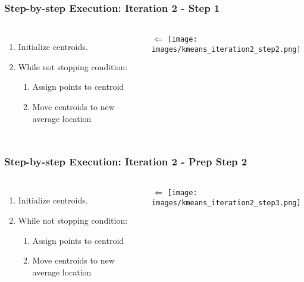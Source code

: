 \documentclass{beamer}
\begin{document}
\begin{frame}
  \frametitle{Step-by-step Execution: Iteration 2 - Step 1}
  \begin{columns}
      \begin{enumerate}
        \item Initialize centroids. \vspace{2mm}
        \item While not stopping condition: \vspace{2mm}
        \begin{enumerate}
          \item Assign points to centroid \vspace{2mm}
          \item Move centroids to new average location
        \end{enumerate}
      \end{enumerate}
      \vspace{11mm} $\Longleftarrow$
      \texttt{[image: images/kmeans\_iteration2\_step2.png]}
  \end{columns}
\end{frame}

\begin{frame}
  \frametitle{Step-by-step Execution: Iteration 2 - Prep Step 2 }
  \begin{columns}
      \begin{enumerate}
        \item Initialize centroids. \vspace{2mm}
        \item While not stopping condition: \vspace{2mm}
        \begin{enumerate}
          \item Assign points to centroid \vspace{2mm}
          \item Move centroids to new average location
        \end{enumerate}
      \end{enumerate}
      \vspace{22mm} $\Longleftarrow$
      \texttt{[image: images/kmeans\_iteration2\_step3.png]}
  \end{columns}
\end{frame}
\end{document}
